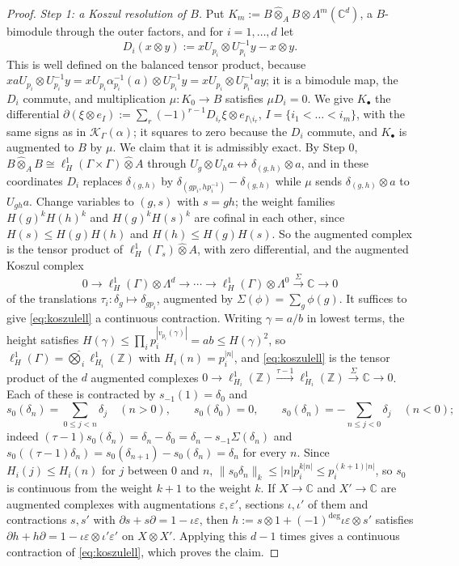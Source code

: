 \documentclass[11pt]{amsart}
\theoremstyle{definition}
\theoremstyle{remark}
\newcommand{\C}{\mathbb C}
\newcommand{\Z}{\mathbb Z}
\begin{document}
\begin{proof}
\emph{Step 1: a Koszul resolution of $B$.}  Put
$K_m:=B\widehat\otimes_AB\otimes\Lambda^{m}(\C^{d})$, a $B$-bimodule through
the outer factors, and for $i=1,\dots,d$ let
\[
D_i(x\otimes y):=xU_{p_i}\otimes U_{p_i}^{-1}y-x\otimes y .
\]
This is well defined on the balanced tensor product, because
$xaU_{p_i}\otimes U_{p_i}^{-1}y=xU_{p_i}\alpha_{p_i}^{-1}(a)\otimes
U_{p_i}^{-1}y=xU_{p_i}\otimes U_{p_i}^{-1}ay$; it is a bimodule map, the
$D_i$ commute, and multiplication $\mu:K_0\to B$ satisfies $\mu D_i=0$.  We
give $K_{\bullet}$ the differential $\partial(\xi\otimes e_I):=
\sum_{r}(-1)^{r-1}D_{i_r}\xi\otimes e_{I\setminus i_r}$,
$I=\{i_1<\dots<i_m\}$, with the same signs as in $\mathcal K_{\Gamma}(\alpha)$;
it squares to zero because the $D_i$ commute, and $K_{\bullet}$ is augmented
to $B$ by $\mu$.  We claim that it is admissibly exact.  By Step 0, $B\widehat\otimes_AB
\cong\ell^{1}_{H}(\Gamma\times\Gamma)\widehat\otimes A$ through
$U_g\otimes U_ha\leftrightarrow\delta_{(g,h)}\otimes a$, and in these
coordinates $D_i$ replaces $\delta_{(g,h)}$ by
$\delta_{(gp_i,hp_i^{-1})}-\delta_{(g,h)}$ while $\mu$ sends
$\delta_{(g,h)}\otimes a$ to $U_{gh}a$.  Change variables to $(g,s)$ with
$s=gh$; the weight families $H(g)^kH(h)^k$ and $H(g)^kH(s)^k$ are cofinal in
each other, since $H(s)\le H(g)H(h)$ and $H(h)\le H(g)H(s)$.  So the augmented
complex is the tensor product of $\ell^{1}_{H}(\Gamma_s)\widehat\otimes A$,
with zero differential, and the augmented Koszul complex
\begin{equation}\label{eq:koszulell}
0\to\ell^{1}_{H}(\Gamma)\otimes\Lambda^{d}\to\cdots\to
\ell^{1}_{H}(\Gamma)\otimes\Lambda^{0}\xrightarrow{\ \Sigma\ }\C\to0
\end{equation}
of the translations $\tau_i:\delta_g\mapsto\delta_{gp_i}$, augmented by
$\Sigma(\phi)=\sum_g\phi(g)$.  It suffices to give \eqref{eq:koszulell} a
continuous contraction.  Writing $\gamma=a/b$ in lowest terms, the height
satisfies $H(\gamma)\le\prod_ip_i^{|v_{p_i}(\gamma)|}=ab\le H(\gamma)^{2}$, so
$\ell^{1}_{H}(\Gamma)=\widehat\bigotimes_i\ell^{1}_{H_i}(\Z)$ with
$H_i(n)=p_i^{|n|}$, and \eqref{eq:koszulell} is the tensor product of the $d$
augmented complexes $0\to\ell^{1}_{H_i}(\Z)\xrightarrow{\tau-1}
\ell^{1}_{H_i}(\Z)\xrightarrow{\Sigma}\C\to0$.  Each of these is contracted
by $s_{-1}(1)=\delta_0$ and
\[
s_0(\delta_n)=\sum_{0\le j<n}\delta_j\quad(n>0),\qquad
s_0(\delta_0)=0,\qquad
s_0(\delta_n)=-\sum_{n\le j<0}\delta_j\quad(n<0);
\]
indeed $(\tau-1)s_0(\delta_n)=\delta_n-\delta_0=\delta_n-s_{-1}\Sigma(\delta_n)$
and $s_0((\tau-1)\delta_n)=s_0(\delta_{n+1})-s_0(\delta_n)=\delta_n$ for
every $n$.  Since $H_i(j)\le H_i(n)$ for $j$ between $0$ and $n$,
$\lVert s_0\delta_n\rVert_k\le|n|p_i^{k|n|}\le p_i^{(k+1)|n|}$, so $s_0$ is
continuous from the weight $k+1$ to the weight $k$.  If $X\to\C$ and
$X'\to\C$ are augmented complexes with augmentations $\varepsilon,\varepsilon'$,
sections $\iota,\iota'$ of them and contractions $s,s'$ with
$\partial s+s\partial=1-\iota\varepsilon$, then
$h:=s\otimes1+(-1)^{\deg}\iota\varepsilon\otimes s'$ satisfies
$\partial h+h\partial=1-\iota\varepsilon\otimes\iota'\varepsilon'$ on
$X\otimes X'$.  Applying this $d-1$ times gives a continuous contraction of
\eqref{eq:koszulell}, which proves the claim.


\end{proof}
\end{document}
